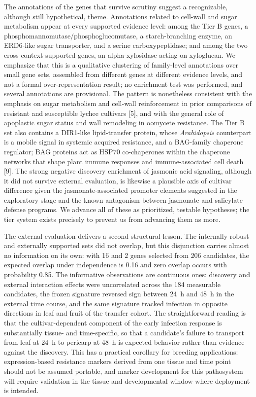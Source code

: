 \documentclass[11pt]{article}
\begin{document}
The annotations of the genes that survive scrutiny suggest a recognizable, although still hypothetical, theme. Annotations related to cell-wall and sugar metabolism appear at every supported evidence level: among the Tier B genes, a phosphomannomutase/phosphoglucomutase, a starch-branching enzyme, an ERD6-like sugar transporter, and a serine carboxypeptidase; and among the two cross-context-supported genes, an alpha-xylosidase acting on xyloglucan. We emphasize that this is a qualitative clustering of family-level annotations over small gene sets, assembled from different genes at different evidence levels, and not a formal over-representation result; no enrichment test was performed, and several annotations are provisional. The pattern is nonetheless consistent with the emphasis on sugar metabolism and cell-wall reinforcement in prior comparisons of resistant and susceptible lychee cultivars [5], and with the general role of apoplastic sugar status and wall remodeling in oomycete resistance. The Tier B set also contains a DIR1-like lipid-transfer protein, whose \textit{Arabidopsis} counterpart is a mobile signal in systemic acquired resistance, and a BAG-family chaperone regulator; BAG proteins act as HSP70 co-chaperones within the chaperone networks that shape plant immune responses and immune-associated cell death [9]. The strong negative discovery enrichment of jasmonic acid signaling, although it did not survive external evaluation, is likewise a plausible axis of cultivar difference given the jasmonate-associated promoter elements suggested in the exploratory stage and the known antagonism between jasmonate and salicylate defense programs. We advance all of these as prioritized, testable hypotheses; the tier system exists precisely to prevent us from advancing them as more.

The external evaluation delivers a second structural lesson. The internally robust and externally supported sets did not overlap, but this disjunction carries almost no information on its own: with 16 and 2 genes selected from 206 candidates, the expected overlap under independence is 0.16 and zero overlap occurs with probability 0.85. The informative observations are continuous ones: discovery and external interaction effects were uncorrelated across the 184 measurable candidates, the frozen signature reversed sign between 24~h and 48~h in the external time course, and the same signature tracked infection in opposite directions in leaf and fruit of the transfer cohort. The straightforward reading is that the cultivar-dependent component of the early infection response is substantially tissue- and time-specific, so that a candidate's failure to transport from leaf at 24~h to pericarp at 48~h is expected behavior rather than evidence against the discovery. This has a practical corollary for breeding applications: expression-based resistance markers derived from one tissue and time point should not be assumed portable, and marker development for this pathosystem will require validation in the tissue and developmental window where deployment is intended.
\end{document}
